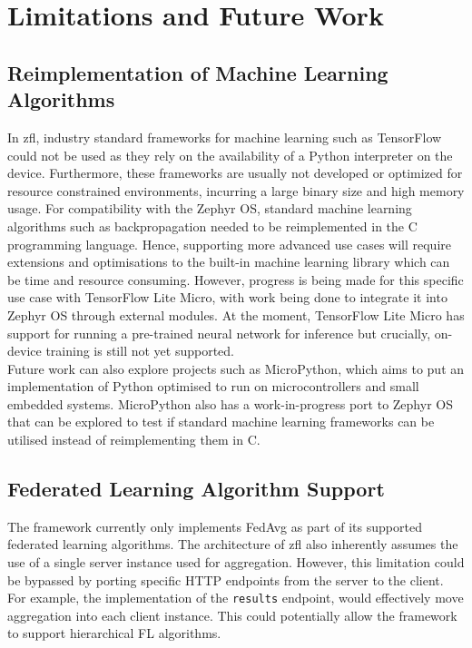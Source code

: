 \documentclass[12pt]{article}
\begin{document}
\pagebreak
\section{Limitations and Future Work}
\subsection{Reimplementation of Machine Learning Algorithms}
In zfl, industry standard frameworks for machine learning such as
TensorFlow\cite{tensorflow2015-whitepaper} could not be used as they rely on the availability of a Python interpreter on
the device. Furthermore, these frameworks are usually not developed or optimized for resource
constrained environments, incurring a large binary size and high memory usage. For compatibility
with the Zephyr OS, standard machine learning algorithms such as backpropagation needed to be
reimplemented in the C programming language. Hence, supporting more advanced use cases will require
extensions and optimisations to the built-in machine learning library which can be time and resource
consuming. However, progress is being made for this specific use case with TensorFlow Lite Micro\cite{tflite},
with work being done to integrate it into Zephyr OS through external modules.
At the moment, TensorFlow Lite Micro has support for running a pre-trained neural network for inference but
crucially, on-device training is still not yet supported. \\

Future work can also explore projects such
as MicroPython\cite{micropython}, which aims to put an implementation of Python optimised to run on microcontrollers and small embedded systems.
MicroPython also has a work-in-progress port to Zephyr OS that can be explored to test if standard
machine learning frameworks can be utilised instead of reimplementing them in C.

\subsection{Federated Learning Algorithm Support}
The framework currently only implements FedAvg as part of its supported federated learning
algorithms. The architecture of zfl also
inherently assumes the use of a single server instance used for aggregation. However, this
limitation could be bypassed by porting specific HTTP endpoints from the server to the client. For
example, the implementation of the \verb|results| endpoint, would effectively move aggregation into
each client instance. This could potentially allow the framework to support hierarchical FL
algorithms\cite{rana_2023_hierarchical}.\\
\end{document}
